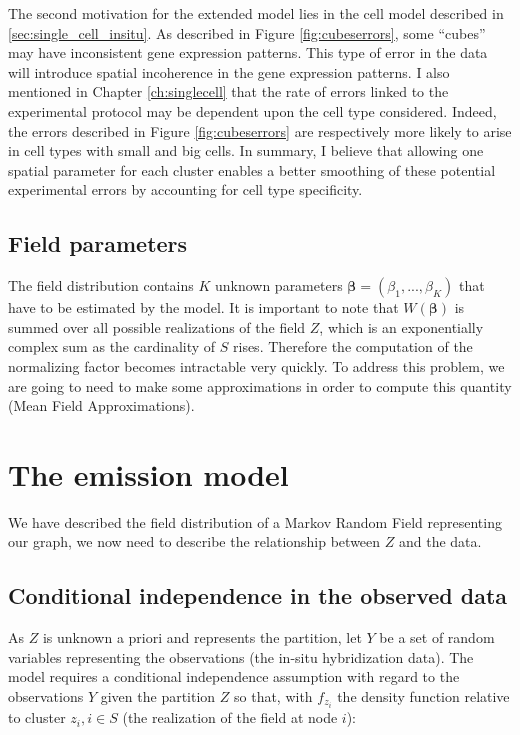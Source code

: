   The second motivation for the extended model lies in the cell model described in \ref{sec:single_cell_insitu}. As described in Figure \ref{fig:cubeserrors}, some ``cubes'' may have inconsistent gene expression patterns. This type of error in the data will introduce spatial incoherence in the gene expression patterns. I also mentioned in Chapter \ref{ch:singlecell} that the rate of errors linked to the experimental protocol may be dependent upon the cell type considered. Indeed, the errors described in Figure \ref{fig:cubeserrors} are respectively more likely to arise in cell types with small and big cells. In summary, I believe that allowing one spatial parameter for each cluster enables a better smoothing of these potential experimental errors by accounting for cell type specificity.\\
 
 \subsection{Field parameters}

The field distribution contains $K$ unknown parameters $\boldsymbol{\beta} = (\beta_{1},...,\beta_{K})$ that have to be estimated by the model. It is important to note that $W(\boldsymbol{\beta})$ is summed over all possible realizations of the field $Z$, which is an exponentially complex sum as the cardinality of $S$ rises. Therefore the computation of the normalizing factor becomes intractable very quickly. To address this problem, we are going to need to make some approximations in order to compute this quantity (Mean Field Approximations).\\

\section{The emission model}

We have described the field distribution of a Markov Random Field representing our graph, we now need to describe the relationship between $Z$ and the data.

\subsection{Conditional independence in the observed data}
As $Z$ is unknown a priori and represents the partition, let $Y$ be a set of random variables representing the observations (the in-situ hybridization data). The model requires a conditional independence assumption with regard to the observations $Y$ given the partition $Z$ so that, with $f_{z_i}$ the density function relative to cluster $z_i, i \in S$ (the realization of the field at node $i$):

